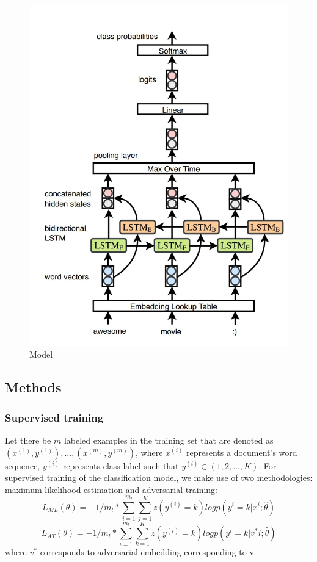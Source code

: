 \documentclass[12pt]{article}
\begin{document}
\begin{figure}
    \includegraphics[width=0.6\linewidth]{Model.jpeg}    
    \caption{Model}
    \label{fig:model}
\end{figure}
\subsection{Methods}
\subsubsection{Supervised training}
Let there be $m$ labeled examples in the training set that
are denoted as ${(x^{(1)} , y^{(1)} ), . . . , (x^{(m)} , y^{(m)} )}$, where $x^{(i)}$
represents a document’s word sequence, $y^{(i)}$ represents class
label such that $y^{(i)} \in  (1, 2, . . . , K)$. For supervised training
of the classification model, we make use of two methodologies: maximum likelihood estimation and adversarial training:-
\begin{equation}
    \label{eq:Ml}
    L_{ML}(\theta) = -1/m_{l} * \sum^{m_{l}}_{i=1} \sum^{K}_{j=1} z (y^{(i)} = k) log p(y^{i}= k |x^{i};\hat{\theta})
\end{equation}
\begin{equation}
    \label{eq:AT}
    L_{AT}(\theta) = -1/m_{l} * \sum^{m_{l}}_{i=1} \sum^{K}_{k=1} z (y^{(i)} = k) log p(y^{i}= k |v^*{i};\hat{\theta})
\end{equation}
where $v^{*}$ corresponds to adversarial embedding corresponding to v
\end{document}
